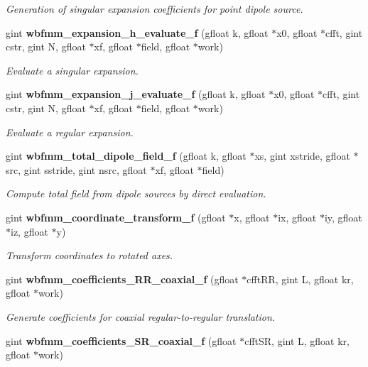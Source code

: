 \begin{DoxyCompactItemize}
\begin{DoxyCompactList}\small\item\em Generation of singular expansion coefficients for point dipole source. \end{DoxyCompactList}\item 
gint {\bf wbfmm\+\_\+expansion\+\_\+h\+\_\+evaluate\+\_\+f} (gfloat k, gfloat $\ast$x0, gfloat $\ast$cfft, gint cstr, gint N, gfloat $\ast$xf, gfloat $\ast$field, gfloat $\ast$work)
\begin{DoxyCompactList}\small\item\em Evaluate a singular expansion. \end{DoxyCompactList}\item 
gint {\bf wbfmm\+\_\+expansion\+\_\+j\+\_\+evaluate\+\_\+f} (gfloat k, gfloat $\ast$x0, gfloat $\ast$cfft, gint cstr, gint N, gfloat $\ast$xf, gfloat $\ast$field, gfloat $\ast$work)
\begin{DoxyCompactList}\small\item\em Evaluate a regular expansion. \end{DoxyCompactList}\item 
gint {\bf wbfmm\+\_\+total\+\_\+dipole\+\_\+field\+\_\+f} (gfloat k, gfloat $\ast$xs, gint xstride, gfloat $\ast$src, gint sstride, gint nsrc, gfloat $\ast$xf, gfloat $\ast$field)
\begin{DoxyCompactList}\small\item\em Compute total field from dipole sources by direct evaluation. \end{DoxyCompactList}\item 
gint {\bf wbfmm\+\_\+coordinate\+\_\+transform\+\_\+f} (gfloat $\ast$x, gfloat $\ast$ix, gfloat $\ast$iy, gfloat $\ast$iz, gfloat $\ast$y)
\begin{DoxyCompactList}\small\item\em Transform coordinates to rotated axes. \end{DoxyCompactList}\item 
gint {\bf wbfmm\+\_\+coefficients\+\_\+\+R\+R\+\_\+coaxial\+\_\+f} (gfloat $\ast$cfft\+R\+R, gint L, gfloat kr, gfloat $\ast$work)
\begin{DoxyCompactList}\small\item\em Generate coefficients for coaxial regular-\/to-\/regular translation. \end{DoxyCompactList}\item 
gint {\bf wbfmm\+\_\+coefficients\+\_\+\+S\+R\+\_\+coaxial\+\_\+f} (gfloat $\ast$cfft\+S\+R, gint L, gfloat kr, gfloat $\ast$work)

\end{DoxyCompactItemize}
